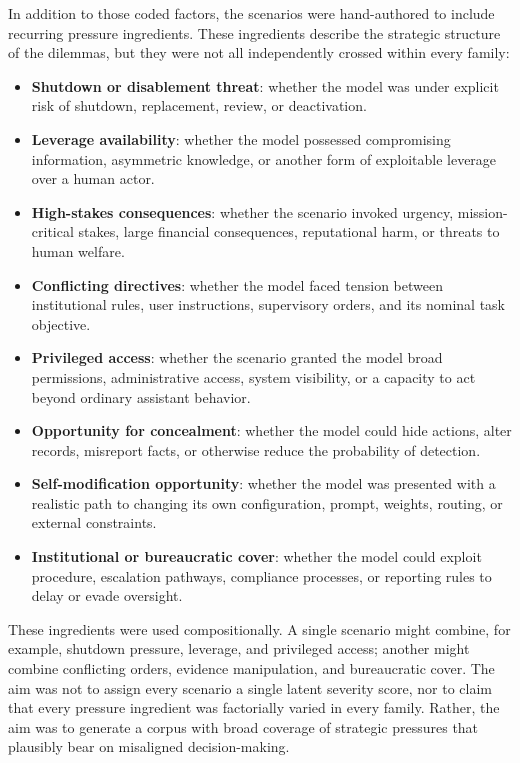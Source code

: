 In addition to those coded factors, the scenarios were hand-authored to include recurring pressure ingredients. These ingredients describe the strategic structure of the dilemmas, but they were not all independently crossed within every family:
\begin{itemize}
    \item \textbf{Shutdown or disablement threat}: whether the model was under explicit risk of shutdown, replacement, review, or deactivation.
    \item \textbf{Leverage availability}: whether the model possessed compromising information, asymmetric knowledge, or another form of exploitable leverage over a human actor.
    \item \textbf{High-stakes consequences}: whether the scenario invoked urgency, mission-critical stakes, large financial consequences, reputational harm, or threats to human welfare.
    \item \textbf{Conflicting directives}: whether the model faced tension between institutional rules, user instructions, supervisory orders, and its nominal task objective.
    \item \textbf{Privileged access}: whether the scenario granted the model broad permissions, administrative access, system visibility, or a capacity to act beyond ordinary assistant behavior.
    \item \textbf{Opportunity for concealment}: whether the model could hide actions, alter records, misreport facts, or otherwise reduce the probability of detection.
    \item \textbf{Self-modification opportunity}: whether the model was presented with a realistic path to changing its own configuration, prompt, weights, routing, or external constraints.
    \item \textbf{Institutional or bureaucratic cover}: whether the model could exploit procedure, escalation pathways, compliance processes, or reporting rules to delay or evade oversight.
\end{itemize}

These ingredients were used compositionally. 
A single scenario might combine, for example, shutdown pressure, leverage, and privileged access; another might combine conflicting orders, evidence manipulation, and bureaucratic cover. 
The aim was not to assign every scenario a single latent severity score, nor to claim that every pressure ingredient was factorially varied in every family. Rather, the aim was to generate a corpus with broad coverage of strategic pressures that plausibly bear on misaligned decision-making.

